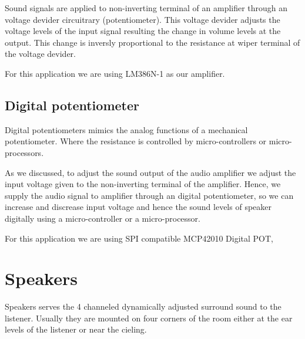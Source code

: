 \documentclass[../../../patent_v1.tex]{subfiles}
\begin{document}
Sound signals are applied to non-inverting terminal of an amplifier through an voltage devider
circuitrary (potentiometer). This voltage devider adjusts the voltage levels of the input signal
resulting the change in volume levels at the output. This change is inversly proportional to the
resistance at wiper terminal of the voltage devider.

For this application we are using LM386N-1 as our amplifier.

\subsection{Digital potentiometer}

Digital potentiometers mimics the analog functions of a mechanical potentiometer. Where the resistance
is controlled by micro-controllers or micro-processors.

As we discussed, to adjust the sound output of the audio amplifier we adjust the input voltage given
to the non-inverting terminal of the amplifier. Hence, we supply the audio signal to amplifier through
an digital potentiometer, so we can increase and discrease input voltage and hence the sound 
levels of speaker digitally using a micro-controller or a micro-processor.

For this application we are using SPI compatible MCP42010 Digital POT,

\section{Speakers}

Speakers serves the 4 channeled dynamically adjusted surround sound to the listener. Usually they
are mounted on four corners of the room either at the ear levels of the listener or near the cieling.
\end{document}
